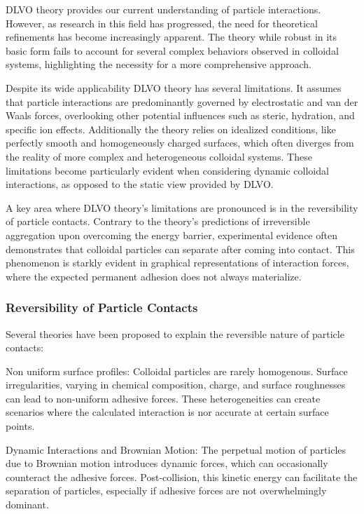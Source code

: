 DLVO theory provides our current understanding of particle interactions. However, as research in this field has progressed, the need for theoretical refinements has become increasingly apparent. The theory while robust in its basic form fails to account for several complex behaviors observed in colloidal systems, highlighting the necessity for a more comprehensive approach.

Despite its wide applicability DLVO theory has several limitations. It assumes that particle interactions are predominantly governed by electrostatic and van der Waals forces, overlooking other potential influences such as steric, hydration, and specific ion effects. Additionally the theory relies on idealized conditions, like perfectly smooth and homogeneously charged surfaces, which often diverges from the reality of more complex and heterogeneous colloidal systems. These limitations become particularly evident when considering dynamic colloidal interactions, as opposed to the static view provided by DLVO.

A key area where DLVO theory's limitations are pronounced is in the reversibility of particle contacts. Contrary to the theory's predictions of irreversible aggregation upon overcoming the energy barrier, experimental evidence often demonstrates that colloidal particles can separate after coming into contact. \cite{DNACollid} This phenomenon is starkly evident in graphical representations of interaction forces, where the expected permanent adhesion does not always materialize.

\subsubsection{Reversibility of Particle Contacts}

Several theories have been proposed to explain the reversible nature of particle contacts:

Non uniform surface profiles: Colloidal particles are rarely homogenous. Surface irregularities, varying in chemical composition, charge, and surface roughnesses can lead to non-uniform adhesive forces. These heterogeneities can create scenarios where the calculated interaction is nor accurate at certain surface points.

Dynamic Interactions and Brownian Motion: The perpetual motion of particles due to Brownian motion introduces dynamic forces, which can occasionally counteract the adhesive forces. Post-collision, this kinetic energy can facilitate the separation of particles, especially if adhesive forces are not overwhelmingly dominant.

